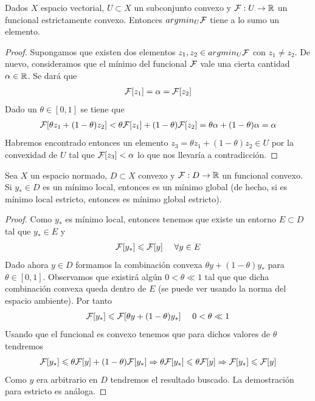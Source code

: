 \begin{coro}
    Dados $X$ espacio vectorial, $U\subset X$ un subconjunto convexo y $\mathcal{F}:U \to \mathbb{R}$ un funcional estrictamente convexo. Entonces $argmin_U \mathcal{F}$ tiene a lo sumo un elemento.
    \begin{proof}
        Supongamos que existen dos elementos $z_1,z_2\in argmin_U\mathcal{F}$ con $z_1\neq z_2$. De nuevo, consideramos que el mínimo del funcional $\mathcal{F}$ vale una cierta cantidad $\alpha\in \mathbb{R}$. Se dará que
        \begin{gather*}
            \mathcal{F}[z_1] = \alpha = \mathcal{F}[z_2]
        \end{gather*}
        Dado un $\theta \in [0,1]$ se tiene que
        \begin{gather*}
            \mathcal{F}[\theta z_1 + (1-\theta)z_2] < \theta \mathcal{F}[z_1] + (1-\theta)\mathcal{F}[z_2] = \theta \alpha + (1-\theta) \alpha = \alpha
        \end{gather*} 
        Habremos encontrado entonces un elemento $z_3 = \theta z_1 + (1-\theta)z_2 \in U$ por la convexidad de $U$ tal que $\mathcal{F}[z_3]<\alpha$ lo que nos llevaría a contradicción.
    \end{proof}
\end{coro}

\begin{prop}
    Sea $X$ un espacio normado, $D \subset X$ convexo y $\mathcal{F}:D \to \mathbb{R}$ un funcional convexo. Si $y_*\in D$ es un mínimo local, entonces es un mínimo global (de hecho, si es mínimo local estricto, entonces es mínimo global estricto).

    \begin{proof}
        Como $y_*$ es mínimo local, entonces tenemos que existe un entorno $E \subset D$ tal que $y_*\in E$ y 
        \begin{gather*}
            \mathcal{F}[y_*] \leqslant \mathcal{F}[y]\ \ \ \ \forall y \in E
        \end{gather*}
        Dado ahora $y\in D$ formamos la combinación convexa $\theta y + (1-\theta)y_*$ para $\theta\in[0,1]$. Observamos que existirá algún $0 < \theta \ll 1$ tal que que dicha combinación convexa queda dentro de $E$ (se puede ver usando la norma del espacio ambiente). Por tanto
        \begin{gather*}
            \mathcal{F}[y_*] \leqslant \mathcal{F}[\theta y + (1-\theta)y_*] \ \ \ \ 0 <\theta \ll1
        \end{gather*}
        Usando que el funcional es convexo tenemos que para dichos valores de $\theta$ tendremos
        \begin{gather*}
            \mathcal{F}[y_*] \leqslant \theta \mathcal{F}[y] + (1-\theta)\mathcal{F}[y_*] \Rightarrow \theta \mathcal{F}[y_*] \leqslant \theta \mathcal{F}[y] \Rightarrow \mathcal{F}[y_*] \leqslant \mathcal{F}[y]
        \end{gather*}
        Como $y$ era arbitrario en $D$ tendremos el resultado buscado. La demostración para estricto es análoga.
    \end{proof}
\end{prop}

